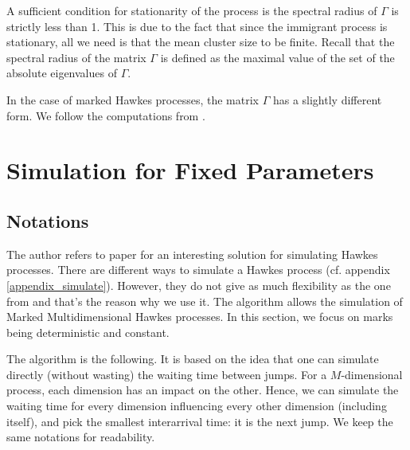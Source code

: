A sufficient condition for stationarity of the process is the spectral radius of $\Gamma$ is strictly less than 1. This is due to the fact that since the immigrant process is stationary, all we need is that the mean cluster size to be finite. Recall that the spectral radius of the matrix $\Gamma$ is defined as the maximal value of the set of the absolute eigenvalues of $\Gamma$.

In the case of marked Hawkes processes, the matrix $\Gamma$ has a slightly different form. We follow the computations from \cite{my_algo_simul}.




\section{Simulation for Fixed Parameters}
\subsection{Notations}

The author refers to paper \cite{my_algo_simul} for an interesting solution for simulating Hawkes processes. There are different ways to simulate a Hawkes process (cf. appendix \ref{appendix_simulate}). However, they do not give as much flexibility as the one from \cite{my_algo_simul} and that's the reason why we use it. The algorithm allows the simulation of Marked Multidimensional Hawkes processes. In this section, we focus on marks being deterministic and constant.


The algorithm is the following. It is based on the idea that one can simulate directly (without wasting) the waiting time between jumps. For a $M$-dimensional process, each dimension has an impact on the other. Hence, we can simulate the waiting time for every dimension influencing every other dimension (including itself), and pick the smallest interarrival time: it is the next jump. We keep the same notations for readability.




